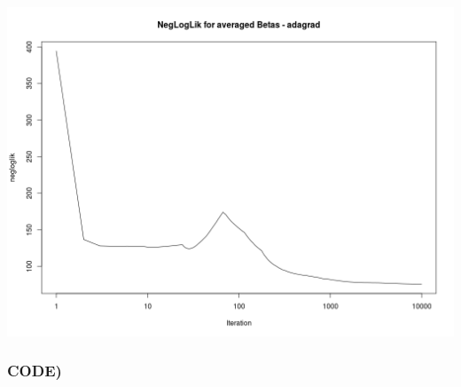 \documentclass{article}
\begin{document}
\includegraphics[width=\textwidth]{Rplot_AdaGrad03.png}

\subsubsection*{CODE)}
\end{document}
